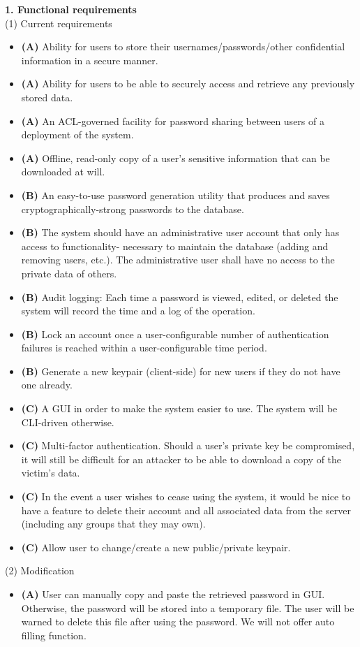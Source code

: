\documentclass[11pt, letterpaper]{article}
\newcommand{\DesignSection}[1]
{\noindent\textbf{#1}\\}
\begin{document}
\DesignSection{1. Functional requirements}
\smallskip
\noindent(1) Current requirements
\begin{itemize} \itemsep1pt \parskip0pt 
\item \textbf{(A) }Ability for users to store their usernames/passwords/other confidential information in a secure manner.
\item \textbf{(A) }Ability for users to be able to securely access and retrieve any previously stored data.
\item \textbf{(A) }An ACL-governed facility for password sharing between users of a deployment of the system.
\item \textbf{(A) }Offline, read-only copy of a user's sensitive information that can be downloaded at will.
\item \textbf{(B) }An easy-to-use password generation utility that produces and saves cryptographically-strong passwords to the database.
\item \textbf{(B) }The system should have an administrative user account that only has access to functionality- necessary to maintain the database (adding and removing users, etc.). The administrative user shall have no access to the private data of others.
\item \textbf{(B) }Audit logging: Each time a password is viewed, edited, or deleted the system will record the time and a log of the operation.
\item \textbf{(B) }Lock an account once a user-configurable number of authentication failures is reached within a user-configurable time period.
\item \textbf{(B) }Generate a new keypair (client-side) for new users if they do not have one already.
\item \textbf{(C) }A GUI in order to make the system easier to use. The system will be CLI-driven otherwise.
\item \textbf{(C) }Multi-factor authentication. Should a user's private key be compromised, it will still be difficult for an attacker to be able to download a copy of the victim's data.
\item \textbf{(C) }In the event a user wishes to cease using the system, it would be nice to have a feature to delete their account and all associated data from the server (including any groups that they may own).
\item \textbf{(C) }Allow user to change/create a new public/private keypair.
\end{itemize}
\smallskip
\noindent(2) Modification
\begin{itemize} \itemsep1pt \parskip0pt 
\item \textbf{(A) }User can manually copy and paste the retrieved password in GUI. Otherwise, the password will be stored into a temporary file. The user will be warned to delete this file after using the password. We will not offer auto filling function.
\end{itemize}
\end{document}
